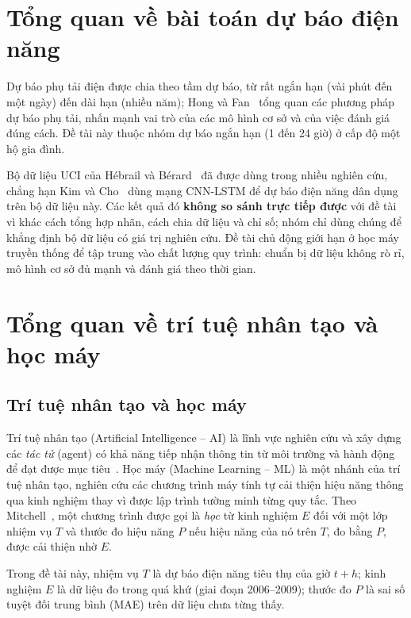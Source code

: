 \documentclass[../main.tex]{subfiles}
\begin{document}
\section{Tổng quan về bài toán dự báo điện năng}
Dự báo phụ tải điện được chia theo tầm dự báo, từ rất ngắn hạn (vài phút đến một ngày) đến dài hạn (nhiều năm); Hong và Fan~\cite{hong2016probabilistic} tổng quan các phương pháp dự báo phụ tải, nhấn mạnh vai trò của các mô hình cơ sở và của việc đánh giá đúng cách. Đề tài này thuộc nhóm dự báo ngắn hạn (1 đến 24 giờ) ở cấp độ một hộ gia đình.

Bộ dữ liệu UCI của Hébrail và Bérard~\cite{hebrail2006uci} đã được dùng trong nhiều nghiên cứu, chẳng hạn Kim và Cho~\cite{kim2019predicting} dùng mạng CNN-LSTM để dự báo điện năng dân dụng trên bộ dữ liệu này. Các kết quả đó \textbf{không so sánh trực tiếp được} với đề tài vì khác cách tổng hợp nhãn, cách chia dữ liệu và chỉ số; nhóm chỉ dùng chúng để khẳng định bộ dữ liệu có giá trị nghiên cứu. Đề tài chủ động giới hạn ở học máy truyền thống để tập trung vào chất lượng quy trình: chuẩn bị dữ liệu không rò rỉ, mô hình cơ sở đủ mạnh và đánh giá theo thời gian.

\section{Tổng quan về trí tuệ nhân tạo và học máy}

\subsection{Trí tuệ nhân tạo và học máy}
Trí tuệ nhân tạo (Artificial Intelligence -- AI) là lĩnh vực nghiên cứu và xây dựng các \textit{tác tử} (agent) có khả năng tiếp nhận thông tin từ môi trường và hành động để đạt được mục tiêu~\cite{russell2020artificial}. Học máy (Machine Learning -- ML) là một nhánh của trí tuệ nhân tạo, nghiên cứu các chương trình máy tính tự cải thiện hiệu năng thông qua kinh nghiệm thay vì được lập trình tường minh từng quy tắc. Theo Mitchell~\cite{mitchell1997machine}, một chương trình được gọi là \textit{học} từ kinh nghiệm $E$ đối với một lớp nhiệm vụ $T$ và thước đo hiệu năng $P$ nếu hiệu năng của nó trên $T$, đo bằng $P$, được cải thiện nhờ $E$.

Trong đề tài này, nhiệm vụ $T$ là dự báo điện năng tiêu thụ của giờ $t+h$; kinh nghiệm $E$ là dữ liệu đo trong quá khứ (giai đoạn 2006--2009); thước đo $P$ là sai số tuyệt đối trung bình (MAE) trên dữ liệu chưa từng thấy.
\end{document}
